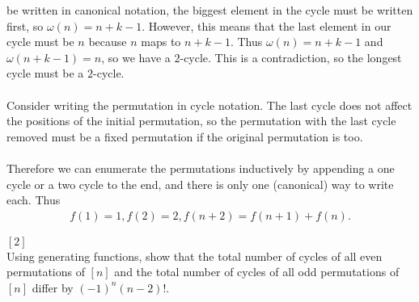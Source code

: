 \documentclass{article}
\newenvironment{problem}[2][Problem]{\begin{trivlist}
\item[\hskip \labelsep {\bfseries #1}\hskip \labelsep {\bfseries #2.}]}{\end{trivlist}}
\newenvironment{solution}[1][Solution.]{\begin{trivlist}
\item[\hskip \labelsep {\bfseries #1}]}{\end{trivlist}}
\begin{document}
\begin{solution}
  be written in canonical notation, the biggest element in the cycle must be
  written first, so $\omega(n) = n + k - 1$.
  However, this means that the last element in our cycle must be $n$ because $n$
  maps to $n + k - 1$.
  Thus $\omega(n) = n + k - 1$ and $\omega(n + k - 1) = n$, so we have a
  $2$-cycle. This is a contradiction, so the longest cycle must be a $2$-cycle.
  \\~\\
  Consider writing the permutation in cycle notation. The last cycle does not
  affect the positions of the initial permutation, so the permutation with the
  last cycle removed must be a fixed permutation if the original permutation
  is too.
  \\~\\
  Therefore we can enumerate the permutations inductively by appending a one cycle
  or a two cycle to the end, and there is only one (canonical) way to write each.
  Thus \begin{align*}
    f(1) = 1,
    f(2) = 2,
    f(n + 2) = f(n + 1) + f(n).
  \end{align*}
\end{solution}
\pagebreak
\begin{problem}{44 (a)} $[2]$ \\
  Using generating functions, show that the total number of cycles of all even
  permutations of $[n]$ and the total number of cycles of all odd permutations
  of $[n]$ differ by
  $(-1)^n(n-2)!$.
\end{problem}
\end{document}
